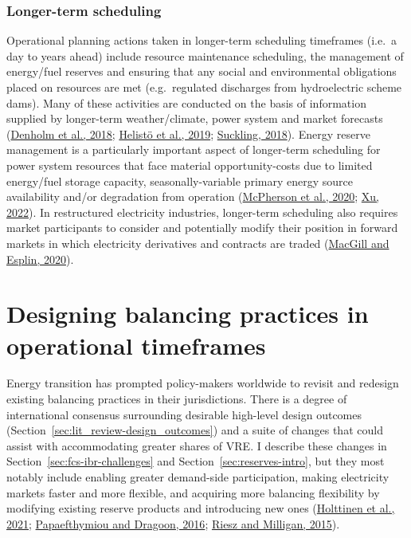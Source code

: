 \documentclass[12pt,a4paper,]{report}
\begin{document}
\hypertarget{longer-term-scheduling}{%
\subsubsection{Longer-term scheduling}\label{longer-term-scheduling}}

Operational planning actions taken in longer-term scheduling timeframes
(i.e.~a day to years ahead) include resource maintenance scheduling, the
management of energy/fuel reserves and ensuring that any social and
environmental obligations placed on resources are met (e.g.~regulated
discharges from hydroelectric scheme dams). Many of these activities are
conducted on the basis of information supplied by longer-term
weather/climate, power system and market forecasts
(\protect\hyperlink{ref-denholmHowLowCan2018}{Denholm et al., 2018};
\protect\hyperlink{ref-helistoIncludingOperationalAspects2019}{Helistö
et al., 2019};
\protect\hyperlink{ref-sucklingSeasonaltoDecadalClimateForecasting2018}{Suckling,
2018}). Energy reserve management is a particularly important aspect of
longer-term scheduling for power system resources that face material
opportunity-costs due to limited energy/fuel storage capacity,
seasonally-variable primary energy source availability and/or
degradation from operation
(\protect\hyperlink{ref-mcphersonImpactsStorageDispatch2020}{McPherson
et al., 2020}; \protect\hyperlink{ref-xuRoleModelingBattery2022}{Xu,
2022}). In restructured electricity industries, longer-term scheduling
also requires market participants to consider and potentially modify
their position in forward markets in which electricity derivatives and
contracts are traded
(\protect\hyperlink{ref-macgillEndtoendElectricityMarket2020}{MacGill
and Esplin, 2020}).

\hypertarget{sec:lit_review-design}{%
\section{Designing balancing practices in operational
timeframes}\label{sec:lit_review-design}}

Energy transition has prompted policy-makers worldwide to revisit and
redesign existing balancing practices in their jurisdictions. There is a
degree of international consensus surrounding desirable high-level
design outcomes (Section~\ref{sec:lit_review-design_outcomes}) and a
suite of changes that could assist with accommodating greater shares of
VRE. I describe these changes in Section~\ref{sec:fcs-ibr-challenges}
and Section~\ref{sec:reserves-intro}, but they most notably include
enabling greater demand-side participation, making electricity markets
faster and more flexible, and acquiring more balancing flexibility by
modifying existing reserve products and introducing new ones
(\protect\hyperlink{ref-holttinenDesignOperationEnergy2021}{Holttinen et
al., 2021};
\protect\hyperlink{ref-papaefthymiou100RenewableEnergy2016}{Papaefthymiou
and Dragoon, 2016};
\protect\hyperlink{ref-rieszDesigningElectricityMarkets2015}{Riesz and
Milligan, 2015}).
\end{document}

